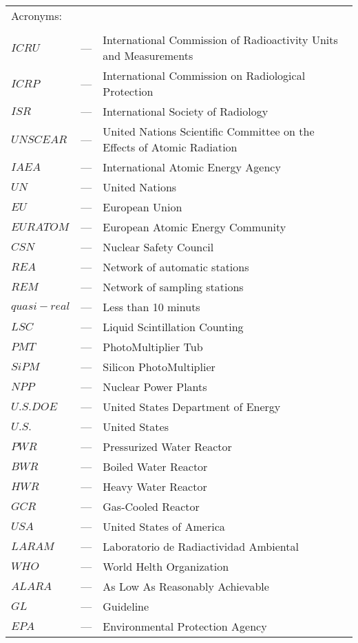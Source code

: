 \begin{longtable}{p{25mm} c p{120mm} }
\multicolumn{3}{l}{Acronyms:}\\
\\
$ICRU$ & --- & International Commission of Radioactivity Units and Measurements\\
$ICRP$ & --- & International Commission on Radiological Protection \\
$ISR$ & --- & International Society of Radiology \\
$UNSCEAR$ & --- & United Nations Scientific Committee on the Effects of Atomic Radiation\\
$IAEA$ & --- & International Atomic Energy Agency \\
$UN$ & --- & United Nations\\
$EU$ & --- & European Union\\
$EURATOM$ & --- & European Atomic Energy Community\\
$CSN$ & --- & Nuclear Safety Council\\
$REA$ & --- & Network of automatic stations\\
$REM$ & --- & Network of sampling stations\\
$quasi-real$ & --- & Less than 10 minuts\\
$LSC$ & --- & Liquid Scintillation Counting\\
$PMT$ & --- & PhotoMultiplier Tub\\
$SiPM$ & --- & Silicon PhotoMultiplier\\
$NPP$ & --- & Nuclear Power Plants\\
$U.S. DOE$ & --- & United States Department of Energy\\
$U.S.$ & --- & United States\\
$PWR$ & --- & Pressurized Water Reactor\\
$BWR$ & --- & Boiled Water Reactor\\
$HWR$ & --- & Heavy Water Reactor\\
$GCR$ & --- & Gas-Cooled Reactor\\
$USA$ & --- & United States of America\\
$LARAM$ & --- & Laboratorio de Radiactividad Ambiental\\
$WHO$ & --- & World Helth Organization\\
$ALARA$ & --- & As Low As Reasonably Achievable\\
$GL$ & --- & Guideline\\
$EPA$ & --- & Environmental Protection Agency\\

\end{longtable}
